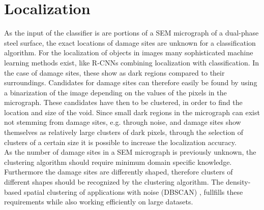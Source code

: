 




\section{Localization}

As the input of the classifier is are portions of a SEM micrograph of a dual-phase steel surface, the exact locations of damage sites are unknown for a classification algorithm. For the localization of objects in images many sophisticated machine learning methods exist, like R-CNNs \cite{Girshick2013} combining localization with classification. In the case of damage sites, these show as dark regions compared to their surroundings. Candidates for damage sites can therefore easily be found by using a binarization of the image depending on the values of the pixels in the micrograph. These candidates have then to be clustered, in order to find the location and size of the void. Since small dark regions in the micrograph can exist not stemming from damage sites, e.g. through noise, and damage sites show themselves as relatively large clusters of dark pixels, through the selection of clusters of a certain size it is possible to increase the localization accuracy.\\

As the number of damage sites in a SEM micrograph is previously unknown, the clustering algorithm should require minimum domain specific knowledge. Furthermore the damage sites are differently shaped, therefore clusters of different shapes should be recognized by the clustering algorithm. The density-based spatial clustering of applications with noise (DBSCAN) \cite{Ester:1996:DAD:3001460.3001507}, fullfills these requirements while also working efficiently on large datasets. 

